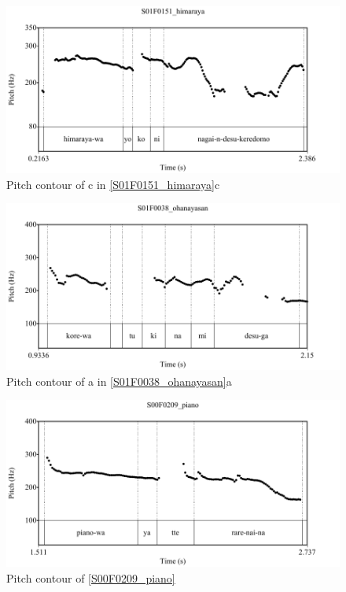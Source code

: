 \begin{figure}
	\begin{center}
	\includegraphics[width=.6\textwidth]{sounds/S01F0151_himaraya.pdf}
	\caption{Pitch contour of c in \ref{S01F0151_himaraya}c}
	\label{S01F0151_himarayaF}
	\end{center}
\end{figure}
\begin{figure}
	\begin{center}
	\includegraphics[width=.6\textwidth]{sounds/S01F0038_ohanayasan.pdf}
	\caption{Pitch contour of a in \ref{S01F0038_ohanayasan}a}
	\label{S01F0038_ohanayasanF}
	\end{center}
\end{figure}
\begin{figure}
	\begin{center}
	\includegraphics[width=.6\textwidth]{sounds/S00F0209_piano.pdf}
	\caption{Pitch contour of \ref{S00F0209_piano}}
	\label{S00F0209_pianoF}
	\end{center}
\end{figure}


